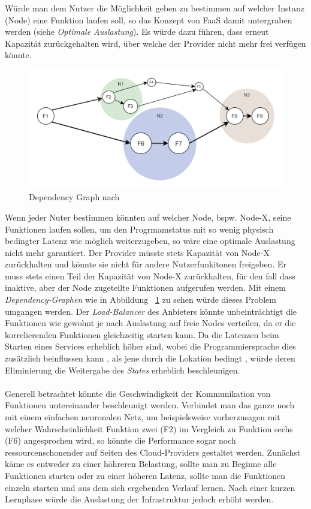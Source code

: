 \documentclass[11pt]{article}
\begin{document}
Würde man dem Nutzer die Möglichkeit geben zu bestimmen auf welcher Instanz (Node) eine Funktion laufen soll, so das Konzept von FaaS damit untergraben werden (siehe \textit{Optimale Auslastung}). Es würde dazu führen, dass erneut Kapazität zurückgehalten wird, über welche der Provider nicht mehr frei verfügen könnte. 
\begin{figure}[H]
\caption{Dependency Graph nach \cite{shafiei2020serverless}}
\label{fig:dependencyGraph}
\centering
\includegraphics[width=1\textwidth]{DependencyGraph}
\end{figure} 
Wenn jeder Nuter bestimmen könnten auf welcher Node, bspw. Node-X, seine Funktionen laufen sollen, um den Progrmamstatus mit so wenig physisch bedingter Latenz wie möglich weiterzugeben, so wäre eine optimale Auslastung nicht mehr garantiert. Der Provider müsste stets Kapazität von Node-X zurückhalten und könnte sie nicht für andere Nutzerfunkitonen freigeben. Er muss stets einen Teil der Kapazität von Node-X zurückhalten, für den fall dass inaktive, aber der Node zugeteilte Funktionen aufgerufen werden. Mit einem \textit{Dependency-Graphen} wie in Abbildung ~\ref{fig:dependencyGraph} zu sehen würde dieses Problem umgangen werden. Der \textit{Load-Balancer} des Anbieters könnte unbeinträchtigt die Funktionen wie gewohnt je nach Auslastung auf freie Nodes verteilen, da er die korrelierenden Funktionen \glqq gleichzeitig\grqq{} starten kann. Da die Latenzen beim Starten eines Services erheblich höher sind, wobei die Programmiersprache dies zusätzlich beinflussen kann \cite{manner2018cold}, als jene durch die Lokation bedingt \cite{aditya2019will} \cite{jackson2018investigation}, würde deren Eliminierung die Weitergabe des \textit{States} erheblich beschleunigen.\\\\ 
Generell betrachtet könnte die Geschwindigkeit der Kommunikation von Funktionen untereinander beschleunigt werden. Verbindet man das ganze noch mit einem einfachen neuronalen Netz, um beispielsweise vorherzusagen mit welcher Wahrscheinlichkeit Funktion zwei (F2) im Vergleich zu Funktion sechs (F6) angesprochen wird, so könnte die Performance sogar noch ressourcenschonender auf Seiten des Cloud-Providers gestaltet werden. Zunächst käme es entweder zu einer höhreren Belastung, sollte man zu Beginne alle Funktionen starten oder zu einer höheren Latenz, sollte man die Funktionen einzeln starten und aus dem sich ergebenden Verlauf lernen. Nach einer kurzen Lernphase würde die Auslastung der Infrastruktur jedoch erhöht werden.\\\\ 
\end{document}

